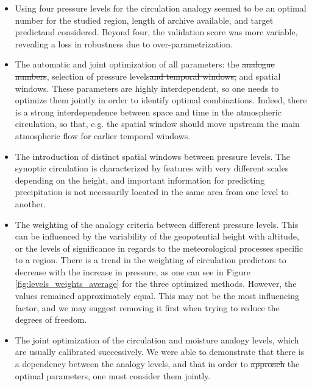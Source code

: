 \documentclass[review]{elsarticle}
\providecommand{\DIFaddtex}[1]{{\protect\color{blue}\uwave{#1}}} %
\providecommand{\DIFdeltex}[1]{{\protect\color{red}\sout{#1}}}                      %
\providecommand{\DIFaddbegin}{} %
\providecommand{\DIFaddend}{} %
\providecommand{\DIFdelbegin}{} %
\providecommand{\DIFdelend}{} %
\providecommand{\DIFadd}[1]{\texorpdfstring{\DIFaddtex{#1}}{#1}} %
\providecommand{\DIFdel}[1]{\texorpdfstring{\DIFdeltex{#1}}{}} %
\begin{document}
\begin{itemize}
	\item Using four pressure levels for the circulation analogy seemed to be an optimal number for the studied region, length of archive available, and target predictand considered. Beyond four, the validation score was more variable, revealing a loss in robustness due to over-parametrization.
	\item The automatic and joint optimization of all parameters: the \DIFdelbegin \DIFdel{analogue numbers}\DIFdelend \DIFaddbegin \DIFadd{number of analogues}\DIFaddend , selection of pressure levels\DIFdelbegin \DIFdel{and temporal windows, }\DIFdelend \DIFaddbegin \DIFadd{, temporal }\DIFaddend and spatial windows. These parameters are highly interdependent, so one needs to optimize them jointly in order to identify optimal combinations. Indeed, there is a strong interdependence between space and time in the atmospheric circulation, so that, e.g. the spatial window should move upstream the main atmospheric flow for earlier temporal windows.
	\item The introduction of distinct spatial windows between pressure levels. The synoptic circulation is characterized by features with very different scales depending on the height, and important information for predicting precipitation is not necessarily located in the same area from one level to another.
	\item The weighting of the analogy criteria between different pressure levels. This can be influenced by the variability of the geopotential height with altitude, or the levels of significance in regards to the meteorological processes specific to a region. There is a trend in the weighting of circulation predictors to decrease with the increase in pressure, as one can see in Figure \ref{fig:levels_weights_average} for the three optimized methods. However, the values remained approximately equal. This may not be the most influencing factor, and we may suggest removing it first when trying to reduce the degrees of freedom.
	\item The joint optimization of the circulation and moisture analogy levels, which are usually calibrated successively. We were able to demonstrate that there is a dependency between the analogy levels, and that in order to \DIFdelbegin \DIFdel{approach }\DIFdelend \DIFaddbegin \DIFadd{find }\DIFaddend the optimal parameters, one must consider them jointly.
\end{itemize}
\end{document}
